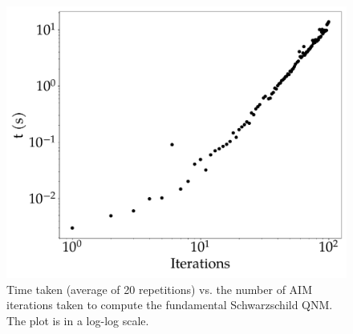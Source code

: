 \begin{figure}[!ht]
  \centering
  \includegraphics[width=\linewidth]{img/aim_qnm/perf.pdf}
  \caption{Time taken (average of 20 repetitions) vs. the number of AIM iterations taken to compute the fundamental Schwarzschild QNM. The plot is in a log-log scale.}
  \label{fig:package_perf}
\end{figure}
